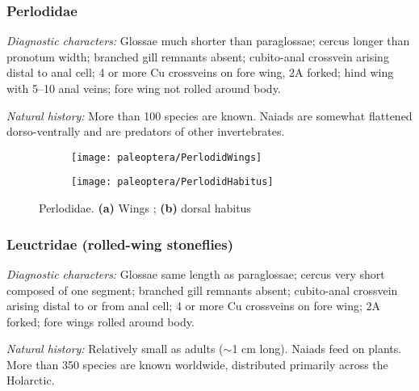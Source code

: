 \subsubsection{Perlodidae}
\noindent{}\textit{Diagnostic characters:} Glossae much shorter than paraglossae; cercus longer than pronotum width; branched gill remnants absent; cubito-anal crossvein arising distal to anal cell; 4 or more Cu crossveins on fore wing, 2A forked; hind wing with 5--10 anal veins; fore wing not rolled around body.\vspace{3mm}

\noindent{}\textit{Natural history:} More than 100 species are known. Naiads are somewhat flattened dorso-ventrally and are predators of other invertebrates.\vspace{3mm}

\begin{figure}[ht!]
    \centering
    \begin{subfigure}[ht!]{0.4\textwidth}
        \texttt{[image: paleoptera/PerlodidWings]}
        \caption{}
        \label{fig:perlodid1}
    \end{subfigure}
    \qquad
    \begin{subfigure}[ht!]{0.5\textwidth}
        \texttt{[image: paleoptera/PerlodidHabitus]}
        \caption{}
        \label{fig:perlodid2}
    \end{subfigure}
    \caption{Perlodidae. \textbf{(a)} Wings \citep[modified from][Plate 9, Fig. 1]{bhl29875}; \textbf{(b)} dorsal habitus \citep[modified from][Fig. 12]{bhl29875}}\label{fig:perlodids}
\end{figure}

\subsubsection{Leuctridae (rolled-wing stoneflies)}
\noindent{}\textit{Diagnostic characters:} Glossae same length as paraglossae; cercus very short composed of one segment; branched gill remnants absent; cubito-anal crossvein arising distal to or from anal cell; 4 or more Cu crossveins on fore wing; 2A forked; fore wings rolled around body.\vspace{3mm}

\noindent{}\textit{Natural history:} Relatively small as adults ($\sim$1 cm long). Naiads feed on plants. More than 350 species are known worldwide, distributed primarily across the Holarctic.\vspace{3mm}

